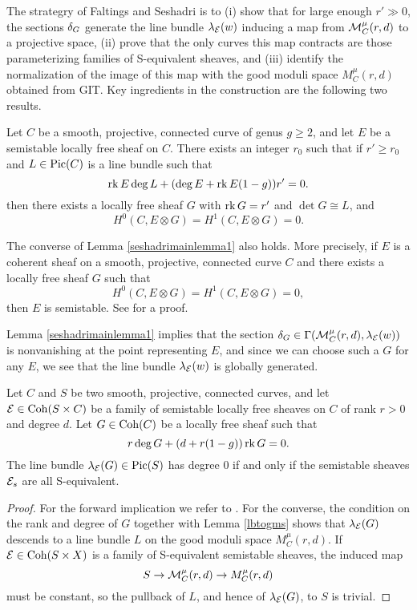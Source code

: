 The strategry of Faltings and Seshadri is to (i) show that for large enough $r' \gg 0$, the sections $\delta_G$ generate the line bundle $\lambda_{\mathcal{E}}(w)$ inducing a map from $\mathcal{M}^\mu_C(r,d)$ to a projective space, (ii) prove that the only curves this map contracts are those parameterizing families of S-equivalent sheaves, and (iii) identify the normalization of the image of this map with the good moduli space $M^\mu_C(r,d)$ obtained from GIT. Key ingredients in the construction are the following two results.

\begin{lem}\label{seshadrimainlemma1}
    Let $C$ be a smooth, projective, connected curve of genus $g \ge 2$, and let $E$ be a semistable locally free sheaf on $C$. There exists an integer $r_0$ such that if $r' \ge r_0$ and $L \in \mathrm{Pic}(C)$ is a line bundle such that
    \[ \operatorname{\mathrm{rk}} E \deg L + (\deg E + \operatorname{\mathrm{rk}} E (1-g)) r' = 0. \]
    then there exists a locally free sheaf $G$ with $\operatorname{\mathrm{rk}} G = r'$ and $\det G \cong L$, and
    \[ H^0(C, E \otimes G) = H^1(C, E \otimes G) = 0. \]
\end{lem}
\begin{rmk}\label{seshadri1converse}
    The converse of Lemma \ref{seshadrimainlemma1} also holds. More precisely, if $E$ is a coherent sheaf on a smooth, projective, connected curve $C$ and there exists a locally free sheaf $G$ such that
    \[ H^0(C, E \otimes G) = H^1(C, E \otimes G) = 0, \]
    then $E$ is semistable. See \cite[Theorem 2.13]{MS} for a proof.
\end{rmk}
Lemma \ref{seshadrimainlemma1} implies that the section $\delta_G \in \Gamma(\mathcal{M}^\mu_C(r,d), \lambda_{\mathcal{E}}(w))$ is nonvanishing at the point representing $E$, and since we can choose such a $G$ for any $E$, we see that the line bundle $\lambda_{\mathcal{E}}(w)$ is globally generated.

\begin{lem}\label{seshadrimainlemma2}
    Let $C$ and $S$ be two smooth, projective, connected curves, and let $\mathcal{E} \in \operatorname{\mathrm{Coh}}(S \times C)$ be a family of semistable locally free sheaves on $C$ of rank $r > 0$ and degree $d$. Let $G \in \operatorname{\mathrm{Coh}}(C)$ be a locally free sheaf such that
    \[ r \deg G + (d + r(1-g)) \operatorname{\mathrm{rk}} G = 0. \]
    The line bundle $\lambda_{\mathcal{E}}(G) \in \mathrm{Pic}(S)$ has degree 0 if and only if the semistable sheaves $\mathcal{E}_s$ are all S-equivalent.
\end{lem}
\begin{proof}
For the forward implication we refer to \cite{seshadri}. For the converse, the condition on the rank and degree of $G$ together with Lemma \ref{lbtogms} shows that $\lambda_{\mathcal{E}}(G)$ descends to a line bundle $L$ on the good moduli space $M^\mu_C(r,d)$. If $\mathcal{E} \in \operatorname{\mathrm{Coh}}(S \times X)$ is a family of S-equivalent semistable sheaves, the induced map
\[ S \to \mathcal{M}^\mu_C(r,d) \to M^\mu_C(r,d) \]
must be constant, so the pullback of $L$, and hence of $\lambda_{\mathcal{E}}(G)$, to $S$ is trivial.
\end{proof}


